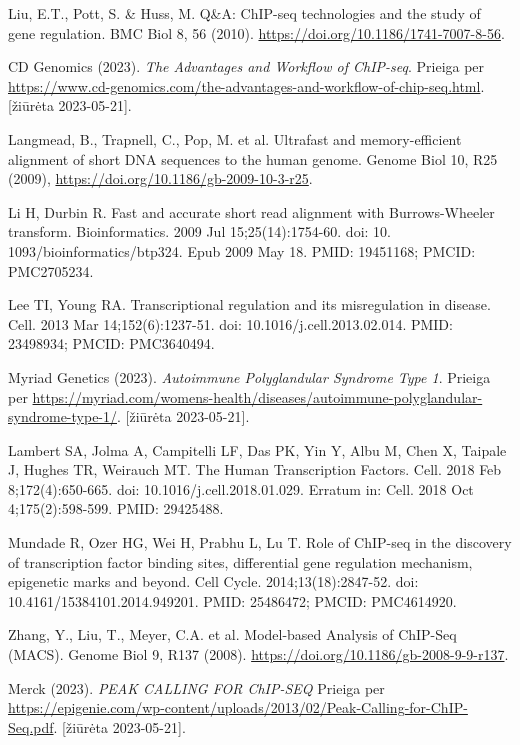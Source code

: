\documentclass[12pt]{article}
\begin{document}
\begin{thebibliography}{99}
 Liu, E.T., Pott, S. \& Huss, M. Q\&A: ChIP-seq technologies
and the study of gene regulation. BMC Biol 8, 56 (2010).
\url{https://doi.org/10.1186/1741-7007-8-56}.

CD Genomics (2023). \emph{The Advantages and Workflow of ChIP-seq}.
Prieiga per \url{https://www.cd-genomics.com/the-advantages-and-workflow-of-chip-seq.html}.
[žiūrėta 2023-05-21].

 Langmead, B., Trapnell, C., Pop, M. et al. Ultrafast and
memory-efficient alignment of short DNA sequences to the human genome. Genome
Biol 10, R25 (2009), \newline
\url{https://doi.org/10.1186/gb-2009-10-3-r25}.

 Li H, Durbin R. Fast and accurate short read alignment with
Burrows-Wheeler transform. Bioinformatics. 2009 Jul 15;25(14):1754-60. doi: 10.
1093/bioinformatics/btp324. Epub 2009 May 18. PMID: 19451168; PMCID: PMC2705234.

 Lee TI, Young RA. Transcriptional regulation and its
misregulation in disease. Cell. 2013 Mar 14;152(6):1237-51.
doi: 10.1016/j.cell.2013.02.014. PMID: 23498934; PMCID: PMC3640494.

Myriad Genetics (2023). \emph{Autoimmune Polyglandular Syndrome Type 1}.
Prieiga per \url{https://myriad.com/womens-health/diseases/autoimmune-polyglandular-syndrome-type-1/}.
[žiūrėta 2023-05-21].

 Lambert SA, Jolma A, Campitelli LF, Das PK, Yin Y, Albu M,
Chen X, Taipale J, Hughes TR, Weirauch MT. The Human Transcription Factors.
Cell. 2018 Feb 8;172(4):650-665. doi: 10.1016/j.cell.2018.01.029.
Erratum in: Cell. 2018 Oct 4;175(2):598-599. PMID: 29425488.

 Mundade R, Ozer HG, Wei H, Prabhu L, Lu T. Role of ChIP-seq
in the discovery of transcription factor binding sites, differential gene
regulation mechanism, epigenetic marks and beyond. Cell Cycle.
2014;13(18):2847-52. doi: 10.4161/15384101.2014.949201. PMID: 25486472;
PMCID: PMC4614920.

 Zhang, Y., Liu, T., Meyer, C.A. et al. Model-based Analysis
of ChIP-Seq (MACS). Genome Biol 9, R137 (2008).
\url{https://doi.org/10.1186/gb-2008-9-9-r137}.

Merck (2023). \emph{PEAK CALLING FOR ChIP-SEQ}
Prieiga per \url{https://epigenie.com/wp-content/uploads/2013/02/Peak-Calling-for-ChIP-Seq.pdf}.
[žiūrėta 2023-05-21].


\end{thebibliography}
\end{document}

